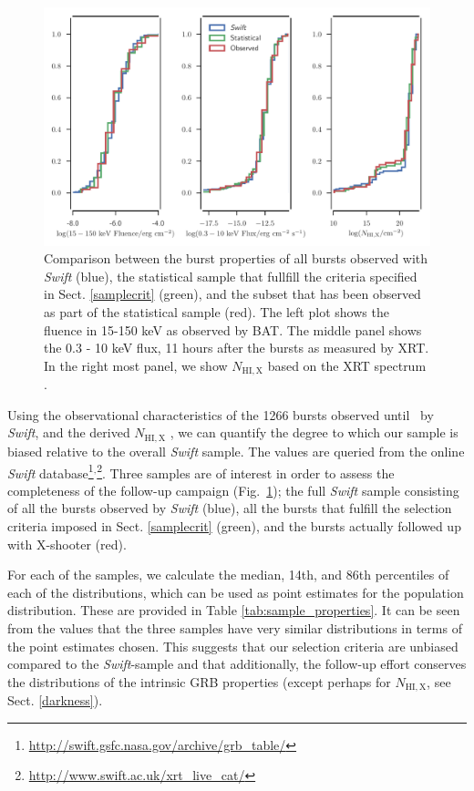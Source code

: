 \documentclass{aa}    %
\begin{document}
\begin{figure}
	\centerline{\includegraphics[width=18cm]{figures/completeness_BAT.pdf}}
\caption{Comparison between the burst properties of all bursts observed with
	\textit{Swift} (blue), the statistical sample that fullfill the criteria
	specified in Sect. \ref{samplecrit} (green), and the subset that has been
	observed as part of the statistical sample (red). The left plot shows the
	fluence in 15-150 keV as observed by BAT. The middle panel shows the 0.3 - 10
	keV flux, 11 hours after the bursts as measured by XRT. In the right most
	panel, we show $N_{\mathrm{HI,X}}$ based on the XRT spectrum
	\citep{Evans2009}.} \label{fig:swift_complete}
\end{figure}

Using the observational characteristics of the 1266 bursts observed until
\termdate~by \textit{Swift}, and the derived $N_{\mathrm{HI,X}}$ \citep{Evans2009}, we can
quantify the degree to which our sample is biased relative to the overall
\textit{Swift} sample. The values are queried from the online \textit{Swift}
database\footnote{\url{http://swift.gsfc.nasa.gov/archive/grb\_table/}}$^,$\footnote{\url{http://www.swift.ac.uk/xrt\_live\_cat/}}. Three samples are of interest in order to assess the completeness of the follow-up campaign (Fig.~\ref{fig:swift_complete}); the full \textit{Swift} sample consisting of all the bursts observed by \textit{Swift} (blue), all the bursts that fulfill the selection criteria imposed in Sect. \ref{samplecrit} (green), and the bursts actually followed up with X-shooter (red).



For each of the samples, we calculate the median, 14th, and 86th percentiles of
each of the distributions, which can be used as point estimates for the
population distribution. These are provided in Table
\ref{tab:sample_properties}. It can be seen from the values that the three
samples have very similar distributions in terms of the point estimates chosen.
This suggests that our selection criteria are unbiased compared to the
\textit{Swift}-sample and that additionally, the follow-up effort conserves the
distributions of the intrinsic GRB properties (except perhaps for
$N_{\mathrm{HI,X}}$, see Sect. \ref{darkness}).
\end{document}
